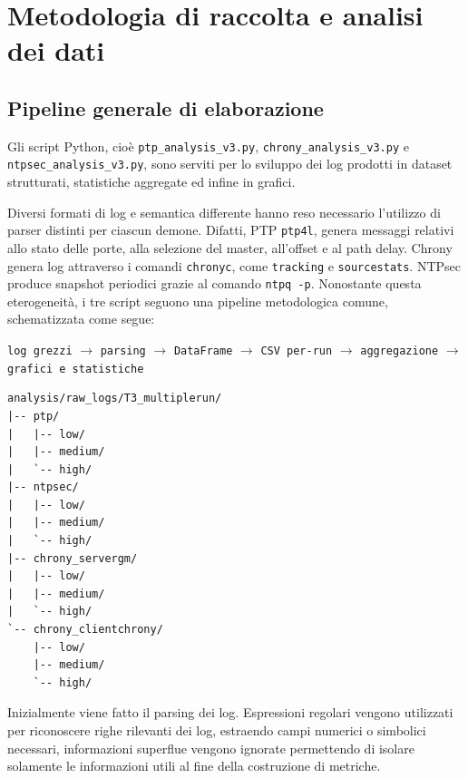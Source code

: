 \chapter{Metodologia di raccolta e analisi dei dati}
\label{cha:metodologiaRaccoltaDati}

\section{Pipeline generale di elaborazione}

Gli script Python, cioè \texttt{ptp\_analysis\_v3.py}, \texttt{chrony\_analysis\_v3.py} e 
\texttt{ntpsec\_analysis\_v3.py}, sono serviti per lo sviluppo dei log prodotti in dataset strutturati, 
statistiche aggregate ed infine in grafici.

Diversi formati di log e semantica differente hanno reso necessario l'utilizzo di parser
distinti per ciascun demone. Difatti, PTP \texttt{ptp4l}, genera messaggi relativi allo stato delle porte, alla selezione
del master, all'offset e al path delay. Chrony genera log attraverso i comandi \texttt{chronyc}, come \texttt{tracking} e
\texttt{sourcestats}. NTPsec produce snapshot periodici grazie al comando \texttt{ntpq -p}. 
Nonostante questa eterogeneità, i tre script seguono una pipeline metodologica comune, schematizzata come segue:

\begin{center}
\texttt{log grezzi}
$\rightarrow$
\texttt{parsing}
$\rightarrow$
\texttt{DataFrame}
$\rightarrow$
\texttt{CSV per-run}
$\rightarrow$
\texttt{aggregazione}
$\rightarrow$
\texttt{grafici e statistiche}
\end{center}


\begin{listing}[H]
\begin{verbatim}
analysis/raw_logs/T3_multiplerun/
|-- ptp/
|   |-- low/
|   |-- medium/
|   `-- high/
|-- ntpsec/
|   |-- low/
|   |-- medium/
|   `-- high/
|-- chrony_servergm/
|   |-- low/
|   |-- medium/
|   `-- high/
`-- chrony_clientchrony/
    |-- low/
    |-- medium/
    `-- high/
\end{verbatim}
\caption{Struttura generale dei log utilizzata dagli script di analisi.}
\label{lst:pipeline-log-structure}
\end{listing}

Inizialmente viene fatto il parsing dei log. Espressioni regolari vengono utilizzati 
per riconoscere righe rilevanti dei log, estraendo campi numerici o simbolici necessari, 
informazioni superflue vengono ignorate permettendo di isolare solamente le informazioni 
utili al fine della costruzione di metriche.

